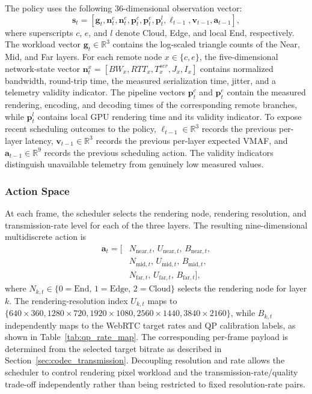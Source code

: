 \documentclass[10pt,journal,compsoc]{IEEEtran}
\begin{document}
The policy uses the following 36-dimensional observation vector:
\begin{equation}
	\mathbf{s}_t = [\mathbf{g}_t,\mathbf{n}^{c}_t,\mathbf{n}^{e}_t,
	\mathbf{p}^{c}_t,\mathbf{p}^{e}_t,\mathbf{p}^{l}_t,
	\boldsymbol{\ell}_{t-1},\mathbf{v}_{t-1},\mathbf{a}_{t-1}],
\end{equation}
where superscripts $c$, $e$, and $l$ denote Cloud, Edge, and local End, respectively. The workload vector $\mathbf{g}_t\in\mathbb{R}^{3}$ contains the log-scaled triangle counts of the Near, Mid, and Far layers. For each remote node $x\in\{c,e\}$, the five-dimensional network-state vector $\mathbf{n}^{x}_t=[BW_x,RTT_x,T^{ser}_x,J_x,I_x]$ contains normalized bandwidth, round-trip time, the measured serialization time, jitter, and a telemetry validity indicator. The pipeline vectors $\mathbf{p}^{c}_t$ and $\mathbf{p}^{e}_t$ contain the measured rendering, encoding, and decoding times of the corresponding remote branches, while $\mathbf{p}^{l}_t$ contains local GPU rendering time and its validity indicator. To expose recent scheduling outcomes to the policy, $\boldsymbol{\ell}_{t-1}\in\mathbb{R}^{3}$ records the previous per-layer latency, $\mathbf{v}_{t-1}\in\mathbb{R}^{3}$ records the previous per-layer expected VMAF, and $\mathbf{a}_{t-1}\in\mathbb{R}^{9}$ records the previous scheduling action. The validity indicators distinguish unavailable telemetry from genuinely low measured values.

\subsubsection{Action Space}
\label{sec:action_space}

At each frame, the scheduler selects the rendering node, rendering resolution, and transmission-rate level for each of the three layers. The resulting nine-dimensional multidiscrete action is
\begin{equation}
\begin{aligned}
	\mathbf{a}_t = [&N_{\mathrm{near},t},\, U_{\mathrm{near},t},\, B_{\mathrm{near},t},\\
	&N_{\mathrm{mid},t},\, U_{\mathrm{mid},t},\, B_{\mathrm{mid},t},\\
	&N_{\mathrm{far},t},\, U_{\mathrm{far},t},\, B_{\mathrm{far},t}],
\end{aligned}
\end{equation}
where $N_{k,t} \in \{0\!=\!\text{End},\, 1\!=\!\text{Edge},\, 2\!=\!\text{Cloud}\}$ selects the rendering node for layer $k$. The rendering-resolution index $U_{k,t}$ maps to $\{640\!\times\!360,1280\!\times\!720,1920\!\times\!1080,2560\!\times\!1440,3840\!\times\!2160\}$, while $B_{k,t}$ independently maps to the WebRTC target rates and QP calibration labels, as shown in Table~\ref{tab:qp_rate_map}. The corresponding per-frame payload is determined from the selected target bitrate as described in Section~\ref{sec:codec_transmission}. Decoupling resolution and rate allows the scheduler to control rendering pixel workload and the transmission-rate/quality trade-off independently rather than being restricted to fixed resolution-rate pairs.
\end{document}
